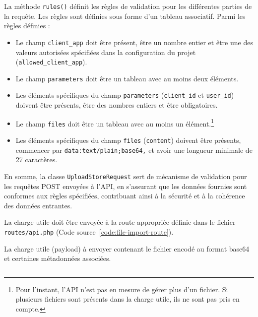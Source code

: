 La méthode \Verb|rules()| définit les règles de validation pour les différentes parties de la requête. Les règles sont définies sous forme d'un tableau associatif. Parmi les règles définies :

\begin{itemize}
    \item Le champ \Verb|client_app| doit être présent, être un nombre entier et être une des valeurs autorisées spécifiées dans la configuration du projet (\Verb|allowed_client_app|).
    \item Le champ \Verb|parameters| doit être un tableau avec au moins deux éléments.
    \item Les éléments spécifiques du champ \Verb|parameters| (\Verb|client_id| et \Verb|user_id|) doivent être présents, être des nombres entiers et être obligatoires.
    \item Le champ \Verb|files| doit être un tableau avec au moins un élément.\footnote{Pour l'instant, l'API n'est pas en mesure de gérer plus d'un fichier. Si plusieurs fichiers sont présents dans la charge utile, ils ne sont pas pris en compte.}
    \item Les éléments spécifiques du champ \Verb|files| (\Verb|content|) doivent être présents, commencer par \Verb|data:text/plain;base64,| et avoir une longueur minimale de 27 caractères.
\end{itemize}

En somme, la classe \Verb|UploadStoreRequest| sert de mécanisme de validation pour les requêtes POST envoyées à l'API, en s'assurant que les données fournies sont conformes aux règles spécifiées, contribuant ainsi à la sécurité et à la cohérence des données entrantes.

La charge utile doit être envoyée à la route appropriée définie dans le fichier \Verb|routes/api.php| (Code source~\ref{code:file-import-route}).

\begin{code}
    \caption{La charge utile (payload) à envoyer contenant le fichier encodé au format base64 et certaines métadonnées associées.}
    \inputminted[samepage]{json}{code/lccc-payload.json}
    \label{code:lccc-payload}
\end{code}


